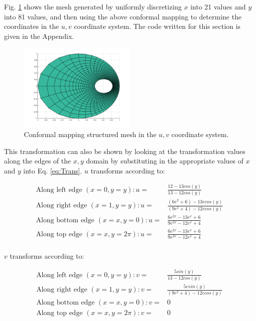 \documentclass[10pt]{article}
\begin{document}
Fig. \ref{fig:q3} shows the mesh generated by uniformly discretizing \(x\) into 21 values and \(y\) into 81 values, and then using the above conformal mapping to determine the coordinates in the \(u, v\) coordinate system. The code written for this section is given in the Appendix.

\begin{figure}[H]
\centering
\includegraphics[width=0.5\textwidth]{Question3.png}
\caption{Conformal mapping structured mesh in the \(u, v\) coordinate system.}
\label{fig:q3}
\end{figure}

This transformation can also be shown by looking at the transformation values along the edges of the \(x,y\) domain by substituting in the appropriate values of \(x\) and \(y\) into Eq. \eqref{eq:Trans}. \(u\) transforms according to: 

\begin{equation}
\begin{aligned}
\textrm{Along left edge } (x=0, y=y): u=& \frac{12-13cos(y)}{13-12cos(y)}\\
\textrm{Along right edge } (x=1, y=y): u=& \frac{(6e^{2}+6)-13ecos(y)}{(9e^{2}+4)-12ecos(y)}\\
\textrm{Along bottom edge } (x=x, y=0): u=& \frac{6e^{2x}-13e^x+6}{9e^{2x}-12e^x+4}\\
\textrm{Along top edge } (x=x, y=2\pi): u=& \frac{6e^{2x}-13e^x+6}{9e^{2x}-12e^x+4}\\
\end{aligned}
\end{equation}

\(v\) transforms according to:

\begin{equation}
\begin{aligned}
\textrm{Along left edge } (x=0, y=y): v=& \frac{5sin(y)}{13-12cos(y)}\\
\textrm{Along right edge } (x=1, y=y): v=& \frac{5esin(y)}{(9e^{2}+4)-12ecos(y)}\\
\textrm{Along bottom edge } (x=x, y=0): v=& 0\\
\textrm{Along top edge } (x=x, y=2\pi): v=& 0\\
\end{aligned}
\end{equation}
\end{document}
